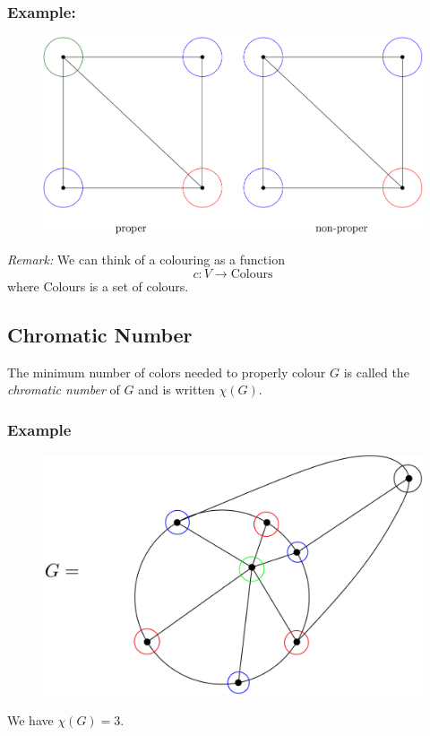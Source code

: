 \documentclass[11pt]{article}
\begin{document}
    \subsubsection{Example:}
    \begin{figure}[H]
        \centering
        \includegraphics[scale=0.2]{proper.png}
    \end{figure}

    \emph{Remark:} We can think of a colouring as a function \[c:V \rightarrow \text{Colours}\] where Colours is a set of colours. 

    \subsection{Chromatic Number}

    The minimum number of colors needed to properly colour $G$ is called the \emph{chromatic number} of $G$ and is written \(\chi(G)\).

    \subsubsection{Example}

    \begin{figure}[H]
        \centering
        \includegraphics[scale=0.2]{chromno.png}
    \end{figure}
    We have \(\chi (G) = 3\). 
\end{document}
